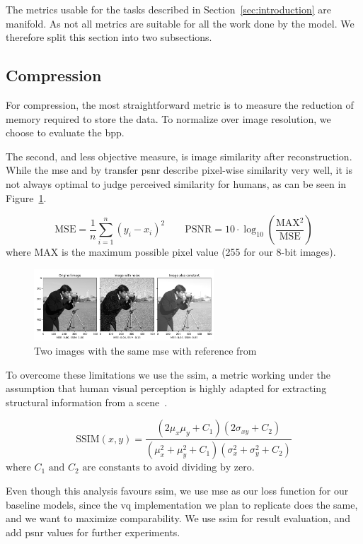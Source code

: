 The metrics usable for the tasks described in Section~\ref{sec:introduction} are manifold.
As not all metrics are suitable for all the work done by the model.
We therefore split this section into two subsections.

\subsection{Compression}\label{subsec:compression}
For compression, the most straightforward metric is to measure the reduction of memory required to
store the data.
To normalize over image resolution, we choose to evaluate the \ac{bpp}.

The second, and less objective measure, is image similarity after reconstruction.
While the \ac{mse} and by transfer \ac{psnr} describe pixel-wise similarity very well, it is not
always optimal to judge perceived similarity for humans, as can be seen in Figure~\ref{fig:mse_ssim}.

\[
\text{MSE} = \frac{1}{n} \sum_{i=1}^{n} (y_i - x_i)^2 \quad \quad \text{PSNR} = 10 \cdot \log_{10} \left( \frac{\text{MAX$^2$}}{\text{MSE}} \right)
\]
where $\text{MAX}$ is the maximum possible pixel value (255 for our 8-bit images).

\begin{figure}[ht]
    \centering
    \includegraphics[width=0.6\textwidth]{images/ssim_mse}
    \caption{Two images with the same \ac{mse} with reference from~\cite{scikit-ssim}}
    \label{fig:mse_ssim}
\end{figure}

To overcome these limitations we use the \ac{ssim}, a metric working under the assumption that human visual
perception is highly adapted for extracting structural information from a scene~\cite{ssim}.

\[
\text{SSIM}(x, y) = \frac{(2\mu_x \mu_y + C_1)(2\sigma_{xy} + C_2)}{(\mu_x^2 + \mu_y^2 + C_1)(\sigma_x^2 + \sigma_y^2 + C_2)}
\]
$\text{where } C_1 \text{ and } C_2 \text{ are constants to avoid dividing by zero.}$


Even though this analysis favours \ac{ssim}, we use \ac{mse} as our loss function for our baseline models,
since the \ac{vq} implementation we plan to replicate does the same, and we want to maximize comparability.
We use \ac{ssim} for result evaluation, and add \ac{psnr} values for further experiments.

